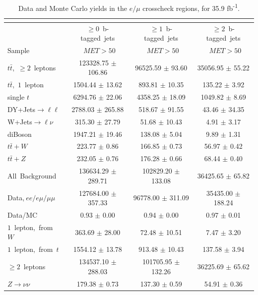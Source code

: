 \begin{table}[htb]
\centering
\caption{Data and Monte Carlo yields in the $e/\mu$ crosscheck
  regions, for 35.9 fb\textsuperscript{-1}.}
\label{tab:emu:yields}
\begin{tabular}{|l|c|c|c|}

\multicolumn{4}{c}{}\\* \hline
  & $\ge0$~b-tagged~jets & $\ge1$~b-tagged~jets  & $\ge2$~b-tagged~jets \\*
Sample  & ~$MET>50$ & ~$MET>50$  & ~$MET>50$ \\*
\hline \hline

$t\bar{t}$,~$\ge2$~leptons & 123328.75 $\pm$ 106.86  & 96525.59 $\pm$ 93.60  & 35056.95 $\pm$ 55.22 \\*
$t\bar{t}$,~$1$~lepton & 1504.44 $\pm$ 13.62  & 893.81 $\pm$ 10.35  & 135.22 $\pm$ 3.92 \\*
single $t$  & 6294.76 $\pm$ 22.06  & 4358.25 $\pm$ 18.09  & 1049.82 $\pm$ 8.69 \\*
DY+Jets$\rightarrow\ell\ell$  & 2788.03 $\pm$ 265.88  & 518.67 $\pm$ 91.55  & 43.46 $\pm$ 34.35 \\*
W+Jets$\rightarrow\ell\nu$  & 315.30 $\pm$ 27.79  & 51.68 $\pm$ 10.43  & 4.91 $\pm$ 3.17 \\*
diBoson  & 1947.21 $\pm$ 19.46  & 138.08 $\pm$ 5.04  & 9.89 $\pm$ 1.31 \\*
$t\bar{t}+W$  & 223.77 $\pm$ 0.86  & 166.85 $\pm$ 0.73  & 56.97 $\pm$ 0.42 \\*
$t\bar{t}+Z$  & 232.05 $\pm$ 0.76  & 176.28 $\pm$ 0.66  & 68.44 $\pm$ 0.40 \\*
\hline \hline
All~Background  & 136634.29 $\pm$ 289.71  & 102829.20 $\pm$ 133.08  & 36425.65 $\pm$ 65.82 \\*
Data,$~ee/e\mu/\mu\mu$  & 127684.00 $\pm$ 357.33  & 96778.00 $\pm$ 311.09  & 35435.00 $\pm$ 188.24 \\*
Data/MC  & 0.93 $\pm$ 0.00  & 0.94 $\pm$ 0.00  & 0.97 $\pm$ 0.01 \\*
\hline \hline
$1$~lepton,~from~$W$  & 363.69 $\pm$ 28.00  & 72.48 $\pm$ 10.51  & 7.47 $\pm$ 3.20 \\*
$1$~lepton,~from~$t$  & 1554.12 $\pm$ 13.78  & 913.48 $\pm$ 10.43  & 137.58 $\pm$ 3.94 \\*
$\ge2$~leptons  & 134537.10 $\pm$ 288.03  & 101705.95 $\pm$ 132.26  & 36225.69 $\pm$ 65.62 \\*
$Z\rightarrow\nu\nu$  & 179.38 $\pm$ 0.73  & 137.30 $\pm$ 0.59  & 54.91 $\pm$ 0.36 \\*
\hline
\end{tabular}
\end{table}

